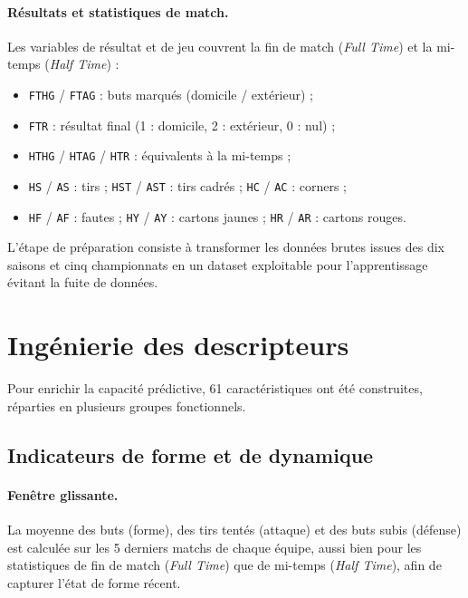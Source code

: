 \paragraph{Résultats et statistiques de match.}
Les variables de résultat et de jeu couvrent la fin de match
(\textit{Full Time}) et la mi-temps (\textit{Half Time}) :
\begin{itemize}
    \item \texttt{FTHG} / \texttt{FTAG} : buts marqués (domicile / extérieur) ;
    \item \texttt{FTR} : résultat final (1 : domicile, 2 : extérieur, 0 : nul) ;
    \item \texttt{HTHG} / \texttt{HTAG} / \texttt{HTR} : équivalents à la mi-temps ;
    \item \texttt{HS} / \texttt{AS} : tirs ; \texttt{HST} / \texttt{AST} : tirs cadrés ; \texttt{HC} / \texttt{AC} : corners ;
    \item \texttt{HF} / \texttt{AF} : fautes ; \texttt{HY} / \texttt{AY} : cartons jaunes ; \texttt{HR} / \texttt{AR} : cartons rouges.
\end{itemize}



\noindent L'étape de préparation consiste à transformer les données brutes issues des
dix saisons et cinq championnats en un dataset exploitable pour l'apprentissage 
évitant la fuite de données.



\section{Ingénierie des descripteurs}
\label{sec:features}

Pour enrichir la capacité prédictive, 61 caractéristiques ont été construites,
réparties en plusieurs groupes fonctionnels.

\subsection{Indicateurs de forme et de dynamique}

\paragraph{Fenêtre glissante.}
La moyenne des buts (forme), des tirs tentés (attaque) et des buts subis (défense)
est calculée sur les 5 derniers matchs de chaque équipe, aussi bien pour les
statistiques de fin de match (\textit{Full Time}) que de mi-temps (\textit{Half Time}),
afin de capturer l'état de forme récent.

